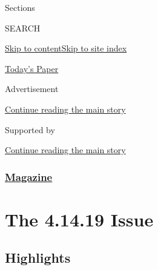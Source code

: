 Sections

SEARCH

\protect\hyperlink{site-content}{Skip to
content}\protect\hyperlink{site-index}{Skip to site index}

\href{https://myaccount.nytimes3xbfgragh.onion/auth/login?response_type=cookie\&client_id=vi}{}

\href{https://www.nytimes3xbfgragh.onion/section/todayspaper}{Today's
Paper}

Advertisement

\protect\hyperlink{after-top}{Continue reading the main story}

Supported by

\protect\hyperlink{after-sponsor}{Continue reading the main story}

\hypertarget{magazine}{%
\subsubsection{\texorpdfstring{\href{/section/magazine}{Magazine}}{Magazine}}\label{magazine}}

\hypertarget{the-41419-issue}{%
\section{The 4.14.19 Issue}\label{the-41419-issue}}

\hypertarget{highlights}{%
\subsection{Highlights}\label{highlights}}


